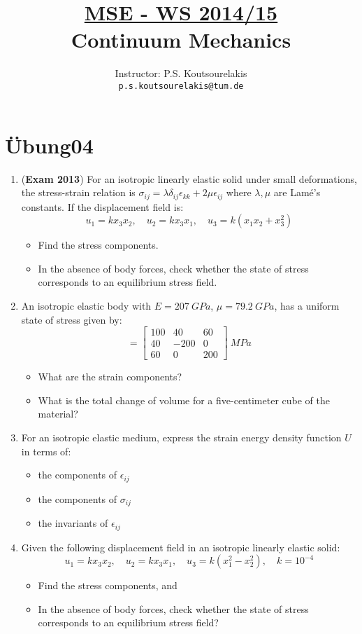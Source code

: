 \documentclass{article}
\title{\underline{MSE - WS 2014/15}\\
Continuum Mechanics}
\author{
Instructor: P.S. Koutsourelakis  \\
\texttt{p.s.koutsourelakis@tum.de} \\
}
\newcommand{\ee}{\end{equation}}
\newcommand{\be}{\begin{equation}}
\newcommand{\bi}{\begin{itemize}}
\newcommand{\ei}{\end{itemize}}
\newcommand{\bs}{\boldsymbol}
\begin{document}
\makeanontitle

%

\section*{\"Ubung04}


\begin{enumerate}
\item (\textbf{Exam 2013}) 
For an isotropic linearly elastic solid under small deformations, the stress-strain relation is $\sigma_{ij}=\lambda \delta_{ij} \epsilon_{kk}+2\mu \epsilon_{ij}$ where $\lambda, \mu$ are Lam\'e's constants.
If the  displacement field is:
\be
u_1= k x_3 x_2, \quad  u_2= kx_3 x_1, \quad  u_3= k (x_1x_2+x_3^2)%
\ee
\bi
\item  Find the stress components.
\item  In the absence of body forces, check whether  the state of stress corresponds to an
equilibrium stress field.
\ei


\item  An isotropic elastic body with $E=  207~ GPa$, $\mu= 79.2~GPa$,  has a uniform state of stress given by:
\be
[\bs{\sigma}]=\left[\begin{array}{ccc} 100 & 40 & 60 \\ 40 & -200 & 0 \\ 60 & 0 & 200 \end{array} \right] ~MPa
\ee
\bi
\item What are the strain components?
\item  What is the total change of volume for a five-centimeter cube of the material?
\ei

\item  For an isotropic elastic medium, express the strain energy density function $U$ in terms of:
\bi
\item the components of $\epsilon_{ij}$
\item the components of $\sigma_{ij}$
\item the invariants of $\epsilon_{ij}$
\ei



\item  Given the following displacement field in an isotropic linearly elastic solid:
\be
u_1= k x_3 x_2, \quad  u_2= kx_3 x_1, \quad  u_3= k (x_1^2-x_2^2), \quad k=10^{-4}
\ee
\bi
\item  Find the stress components, and
\item  In the absence of body forces, check whether  the state of stress corresponds to an
equilibrium stress field?
\ei


\end{enumerate}
\end{document}
